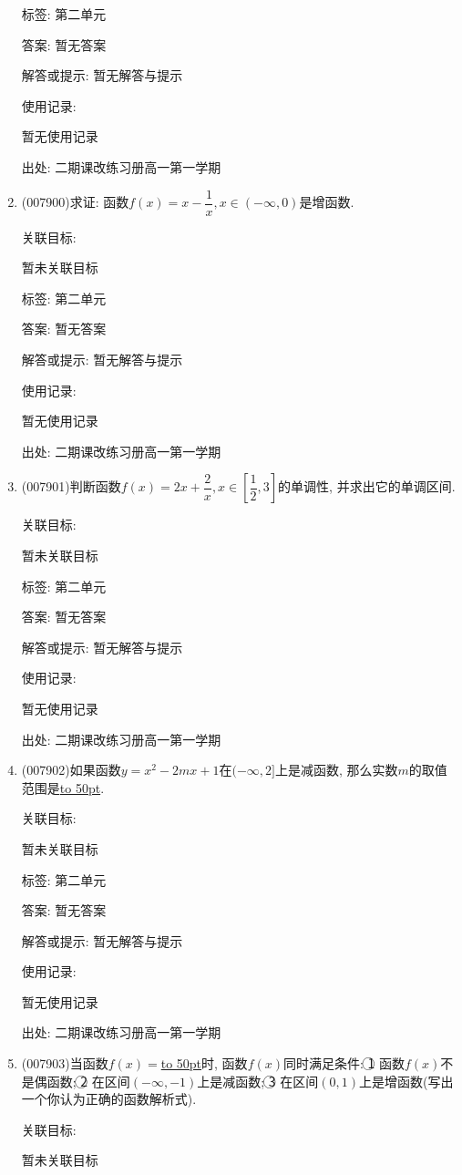 \documentclass[10pt,a4paper]{article}
\newcommand{\blank}[1]{\underline{\hbox to #1pt{}}}
\begin{document}
\begin{enumerate}[1.]
标签: 第二单元

答案: 暂无答案

解答或提示: 暂无解答与提示

使用记录:

暂无使用记录


出处: 二期课改练习册高一第一学期
\item { (007900)}求证: 函数$f(x)=x-\dfrac 1x,x\in (-\infty ,0)$是增函数.


关联目标:

暂未关联目标



标签: 第二单元

答案: 暂无答案

解答或提示: 暂无解答与提示

使用记录:

暂无使用记录


出处: 二期课改练习册高一第一学期
\item { (007901)}判断函数$f(x)=2x+\dfrac 2x,x\in [\dfrac 12,3]$的单调性, 并求出它的单调区间.


关联目标:

暂未关联目标



标签: 第二单元

答案: 暂无答案

解答或提示: 暂无解答与提示

使用记录:

暂无使用记录


出处: 二期课改练习册高一第一学期
\item { (007902)}如果函数$y=x^2-2mx+1$在$(-\infty ,2]$上是减函数, 那么实数$m$的取值范围是\blank{50}.


关联目标:

暂未关联目标



标签: 第二单元

答案: 暂无答案

解答或提示: 暂无解答与提示

使用记录:

暂无使用记录


出处: 二期课改练习册高一第一学期
\item { (007903)}当函数$f(x)=$\blank{50}时, 函数$f(x)$同时满足条件: \textcircled{1} 函数$f(x)$不是偶函数; \textcircled{2} 在区间$(-\infty ,-1)$上是减函数; \textcircled{3} 在区间$(0,1)$上是增函数(写出一个你认为正确的函数解析式).


关联目标:

暂未关联目标




\end{enumerate}
\end{document}

